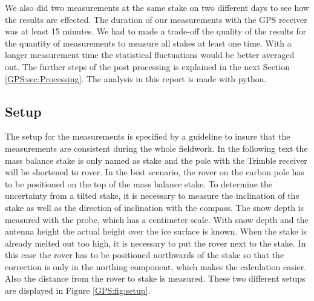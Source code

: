 We also did two measurements at the same stake on two different days to see how the results are effected.
The duration of our measurements with the GPS receiver was at least 15 minutes. 
We had to made a trade-off the quality of the results for the quantity of
measurements to measure all stakes at least one time. 
With a longer measurement time the statistical fluctuations would be better averaged out.
The further steps of the post processing is explained in the next Section \ref{GPS:sec:Processing}.\newline
The analysis in this report is made with python.

\subsection{Setup} \label{GPS:subsec:setup}

The setup for the measurements is specified by a guideline to insure that the measurements are consistent during the whole fieldwork.
In the following text the mass balance stake is only named as stake and the pole with the Trimble receiver will be shortened to rover.
In the best scenario, the rover on the carbon pole has to be positioned on the top of the mass balance stake.
To determine the uncertainty from a tilted stake, it is necessary to measure the inclination of the stake as well as the direction of inclination with the compass.
The snow depth is measured with the probe, which has a centimeter scale.
With snow depth and the antenna height the actual height over the ice surface is known. 
When the stake is already melted out too high, it is necessary to put the rover next to the stake. 
In this case the rover has to be positioned northwards of the stake so that the correction is only in the northing component, which makes the calculation easier. 
Also the distance from the rover to stake is measured.
These two different setups are displayed in Figure \ref{GPS:fig:setup}.


